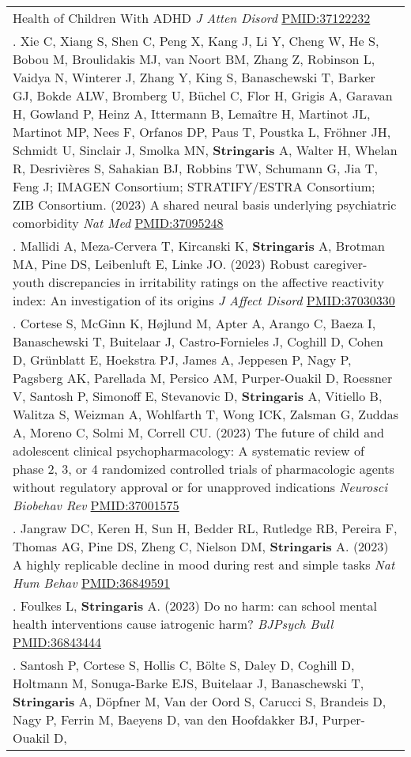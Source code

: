 \documentclass[
]{article}
\begin{document}
\begin{longtable}[]{@{}
  >{\raggedright\arraybackslash}p{}@{}}
Health of Children With ADHD \emph{J Atten Disord}
\url{PMID:37122232} \\
20. Xie C, Xiang S, Shen C, Peng X, Kang J, Li Y, Cheng W, He S, Bobou
M, Broulidakis MJ, van Noort BM, Zhang Z, Robinson L, Vaidya N, Winterer
J, Zhang Y, King S, Banaschewski T, Barker GJ, Bokde ALW, Bromberg U,
Büchel C, Flor H, Grigis A, Garavan H, Gowland P, Heinz A, Ittermann B,
Lemaître H, Martinot JL, Martinot MP, Nees F, Orfanos DP, Paus T,
Poustka L, Fröhner JH, Schmidt U, Sinclair J, Smolka MN,
\textbf{Stringaris} A, Walter H, Whelan R, Desrivières S, Sahakian BJ,
Robbins TW, Schumann G, Jia T, Feng J; IMAGEN Consortium; STRATIFY/ESTRA
Consortium; ZIB Consortium. (2023) A shared neural basis underlying
psychiatric comorbidity \emph{Nat Med} \url{PMID:37095248} \\
21. Mallidi A, Meza-Cervera T, Kircanski K, \textbf{Stringaris} A,
Brotman MA, Pine DS, Leibenluft E, Linke JO. (2023) Robust
caregiver-youth discrepancies in irritability ratings on the affective
reactivity index: An investigation of its origins \emph{J Affect Disord}
\url{PMID:37030330} \\
22. Cortese S, McGinn K, Højlund M, Apter A, Arango C, Baeza I,
Banaschewski T, Buitelaar J, Castro-Fornieles J, Coghill D, Cohen D,
Grünblatt E, Hoekstra PJ, James A, Jeppesen P, Nagy P, Pagsberg AK,
Parellada M, Persico AM, Purper-Ouakil D, Roessner V, Santosh P,
Simonoff E, Stevanovic D, \textbf{Stringaris} A, Vitiello B, Walitza S,
Weizman A, Wohlfarth T, Wong ICK, Zalsman G, Zuddas A, Moreno C, Solmi
M, Correll CU. (2023) The future of child and adolescent clinical
psychopharmacology: A systematic review of phase 2, 3, or 4 randomized
controlled trials of pharmacologic agents without regulatory approval or
for unapproved indications \emph{Neurosci Biobehav Rev}
\url{PMID:37001575} \\
23. Jangraw DC, Keren H, Sun H, Bedder RL, Rutledge RB, Pereira F,
Thomas AG, Pine DS, Zheng C, Nielson DM, \textbf{Stringaris} A. (2023) A
highly replicable decline in mood during rest and simple tasks \emph{Nat
Hum Behav} \url{PMID:36849591} \\
24. Foulkes L, \textbf{Stringaris} A. (2023) Do no harm: can school
mental health interventions cause iatrogenic harm? \emph{BJPsych Bull}
\url{PMID:36843444} \\
25. Santosh P, Cortese S, Hollis C, Bölte S, Daley D, Coghill D,
Holtmann M, Sonuga-Barke EJS, Buitelaar J, Banaschewski T,
\textbf{Stringaris} A, Döpfner M, Van der Oord S, Carucci S, Brandeis D,
Nagy P, Ferrin M, Baeyens D, van den Hoofdakker BJ, Purper-Ouakil D,

\end{longtable}
\end{document}
